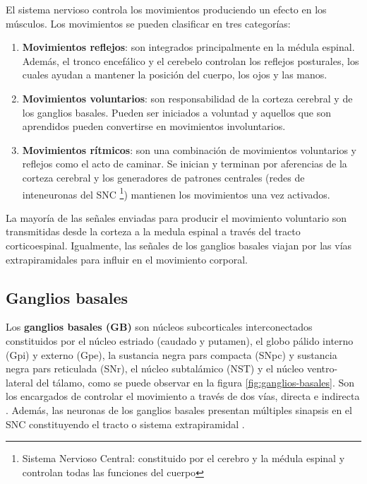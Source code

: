 El sistema nervioso controla los movimientos produciendo un efecto en los músculos. Los movimientos se pueden clasificar en tres categorías:

\begin{enumerate}
    \item \textbf{Movimientos reflejos}: son integrados principalmente en la médula espinal. Además, el tronco encefálico y el cerebelo controlan los reflejos posturales, los cuales ayudan a mantener la posición del cuerpo, los ojos y las manos.
    \item \textbf{Movimientos voluntarios}: son responsabilidad de la corteza cerebral y de los ganglios basales. Pueden ser iniciados a voluntad y aquellos que son aprendidos pueden convertirse en movimientos involuntarios.
    \item \textbf{Movimientos rítmicos}: son una combinación de movimientos voluntarios y reflejos como el acto de caminar. Se inician y terminan por aferencias de la corteza cerebral y los generadores de patrones centrales (redes de inteneuronas del SNC \footnote{Sistema Nervioso Central: constituido por el cerebro y la médula espinal y controlan todas las funciones del cuerpo}) mantienen los movimientos una vez activados.
\end{enumerate}


La mayoría de las señales enviadas para producir el movimiento voluntario son transmitidas desde la corteza a la medula espinal a través del tracto corticoespinal. Igualmente, las señales de los ganglios basales viajan por las vías extrapiramidales para influir en el movimiento corporal.



\subsection{Ganglios basales}

Los \textbf{ganglios basales (GB)} son núcleos subcorticales interconectados constituidos por el núcleo estriado (caudado y putamen), el globo pálido interno (Gpi) y externo (Gpe), la sustancia negra pars compacta (SNpc) y sustancia negra pars reticulada (SNr), el núcleo subtalámico (NST) y el núcleo ventro-lateral del tálamo, como se puede observar en la figura \ref{fig:ganglios-basales}. Son los encargados de controlar el movimiento a través de dos vías, directa e indirecta \cite{MARTINEZFERNANDEZ2016363}. Además, las neuronas de los ganglios basales presentan múltiples sinapsis en el SNC constituyendo el tracto o sistema extrapiramidal \cite{alma991000263829705771}.

